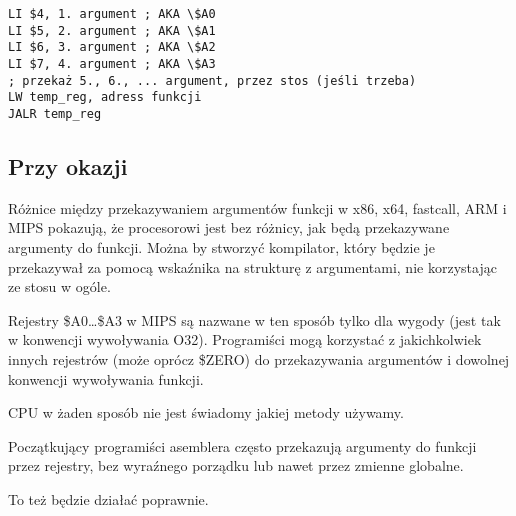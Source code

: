 \begin{lstlisting}[caption=MIPS (konwencja wywoływania O32),style=customasmMIPS]
LI $4, 1. argument ; AKA \$A0
LI $5, 2. argument ; AKA \$A1
LI $6, 3. argument ; AKA \$A2
LI $7, 4. argument ; AKA \$A3
; przekaż 5., 6., ... argument, przez stos (jeśli trzeba)
LW temp_reg, adress funkcji
JALR temp_reg
\end{lstlisting}

\subsection{Przy okazji}

Różnice między przekazywaniem argumentów funkcji w x86, x64, fastcall, ARM i MIPS pokazują, że procesorowi jest bez różnicy,
jak będą przekazywane argumenty do funkcji. Można by stworzyć kompilator, który będzie je przekazywał za pomocą wskaźnika na strukturę z argumentami, nie korzystając ze stosu w ogóle.

Rejestry \$A0\dots \$A3 w MIPS są nazwane w ten sposób tylko dla wygody (jest tak w konwencji wywoływania O32).
Programiści mogą korzystać z jakichkolwiek innych rejestrów (może oprócz \$ZERO) do przekazywania argumentów i dowolnej konwencji wywoływania funkcji.

\ac{CPU} w żaden sposób nie jest świadomy jakiej metody używamy.

Początkujący programiści asemblera często przekazują argumenty do funkcji przez rejestry, bez wyraźnego porządku lub nawet przez zmienne globalne.

To też będzie działać poprawnie.


